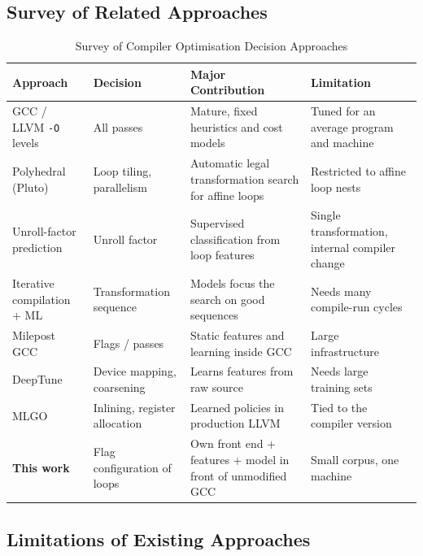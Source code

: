 \subsection{Survey of Related Approaches}

\begin{table}[H]
\centering
\caption{Survey of Compiler Optimisation Decision Approaches}
\label{tab:survey}
\small
\begin{tabularx}{\textwidth}{p{2.6cm}p{2.5cm}X p{2.9cm}}
\toprule
\textbf{Approach} & \textbf{Decision} & \textbf{Major Contribution} &
\textbf{Limitation}\\
\midrule

GCC / LLVM \texttt{-O} levels
& All passes
& Mature, fixed heuristics and cost models
& Tuned for an average program and machine\\

Polyhedral (Pluto)
& Loop tiling, parallelism
& Automatic legal transformation search for affine loops
& Restricted to affine loop nests\\

Unroll-factor prediction \cite{stephenson2005}
& Unroll factor
& Supervised classification from loop features
& Single transformation, internal compiler change\\

Iterative compilation + ML \cite{agakov2006}
& Transformation sequence
& Models focus the search on good sequences
& Needs many compile-run cycles\\

Milepost GCC \cite{fursin2011}
& Flags / passes
& Static features and learning inside GCC
& Large infrastructure\\

DeepTune \cite{cummins2017}
& Device mapping, coarsening
& Learns features from raw source
& Needs large training sets\\

MLGO \cite{trofin2021}
& Inlining, register allocation
& Learned policies in production LLVM
& Tied to the compiler version\\

\textbf{This work}
& Flag configuration of loops
& Own front end + features + model in front of unmodified GCC
& Small corpus, one machine\\

\bottomrule
\end{tabularx}
\end{table}

\subsection{Limitations of Existing Approaches}

